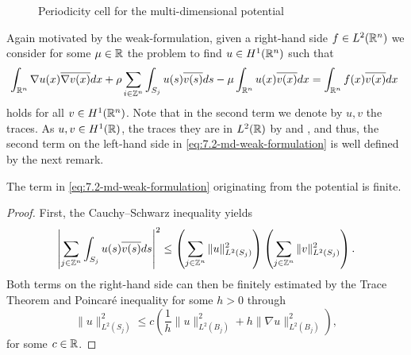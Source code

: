 \begin{figure}[!ht] \centering
	\caption{Periodicity cell for the multi-dimensional potential} \label{fig:md-cell}
\end{figure}

Again motivated by the weak-formulation, given a right-hand side $f \in L^{2}(\mathbb{R}^{n})$ we consider for some	 $\mu \in \mathbb{R}$ the problem to find $u \in H^{1}(\mathbb{R}^{n})$ such that
	\begin{equation}
		\int_{\R^{n}} \nabla u(x) \overline{\nabla v(x)} dx + \rho \sum_{i \in \Z^{n}} \int_{S_{j}} u(s) \overline{v(s)} ds - \mu \int_{\R^{n}} u(x) \overline{v(x)} dx = \int_{\R^{n}} f(x) \overline{v(x)} dx \label{eq:7.2-md-weak-formulation}
	\end{equation} 
holds for all $v \in H^{1}(\mathbb{R}^{n})$. Note that in the second term we denote by $u, v$ the traces. As $u, v \in H^{1}(\mathbb{R})$, the traces they are in $L^{2}(\mathbb{R})$ by \cite[page 251, Theorem 5.1]{evans1998partial} and \cite[page 164]{adams2003sobolev}, and thus, the second term on the left-hand side in \eqref{eq:7.2-md-weak-formulation} is well defined by the next remark.

\begin{remark} 
	The term in \eqref{eq:7.2-md-weak-formulation} originating from the potential is finite.
	
	\begin{proof}
	 First, the Cauchy–Schwarz inequality yields
	\[ \left| \sum_{j \in \mathbb{Z}^{n}} \int_{S_{j}} u(s) \overline{v(s)} ds \right|^{2} \leq \left( \sum_{j \in \mathbb{Z}^{n}} \| u \|_{L^{2}(S_{j})}^{2} \right) \left( \sum_{j \in \mathbb{Z}^{n}} \| v \|_{L^{2}(S_{j})}^{2} \right). \] 
	Both terms on the right-hand side can then be finitely estimated by the Trace Theorem \cite[page 258]{evans1998partial} and Poincaré inequality for some $h > 0$ through %
	\[ \| u \|_{L^{2}(S_{j})}^{2} \leq c \left( \frac{1}{h} \|u\|_{L^{2}(B_{j})}^{2} + h \| \nabla u \|_{L^{2}(B_{j})}^{2} \right), \]	
	for some $c \in \mathbb{R}$.
	\end{proof}
\end{remark}

